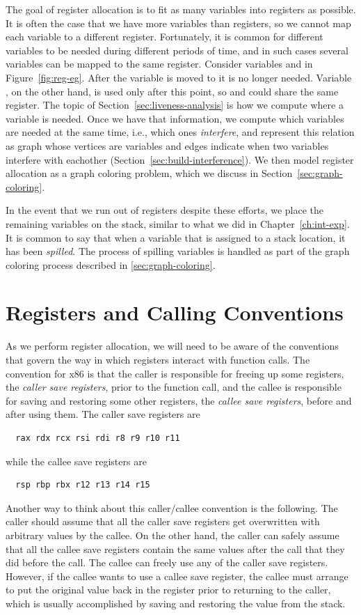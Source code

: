 \documentclass[11pt]{book}
\begin{document}
The goal of register allocation is to fit as many variables into
registers as possible. It is often the case that we have more
variables than registers, so we cannot map each variable to a
different register. Fortunately, it is common for different variables
to be needed during different periods of time, and in such cases
several variables can be mapped to the same register.  Consider
variables  and  in Figure~\ref{fig:reg-eg}.  After the
variable  is moved to  it is no longer needed.
Variable , on the other hand, is used only after this point,
so  and  could share the same register. The topic of
Section~\ref{sec:liveness-analysis} is how we compute where a variable
is needed.  Once we have that information, we compute which variables
are needed at the same time, i.e., which ones \emph{interfere}, and
represent this relation as graph whose vertices are variables and
edges indicate when two variables interfere with eachother
(Section~\ref{sec:build-interference}). We then model register
allocation as a graph coloring problem, which we discuss in
Section~\ref{sec:graph-coloring}.

In the event that we run out of registers despite these efforts, we
place the remaining variables on the stack, similar to what we did in
Chapter~\ref{ch:int-exp}. It is common to say that when a variable
that is assigned to a stack location, it has been \emph{spilled}. The
process of spilling variables is handled as part of the graph coloring
process described in \ref{sec:graph-coloring}.

\section{Registers and Calling Conventions}
\label{sec:calling-conventions}

As we perform register allocation, we will need to be aware of the
conventions that govern the way in which registers interact with
function calls. The convention for x86 is that the caller is
responsible for freeing up some registers, the \emph{caller save
  registers}, prior to the function call, and the callee is
responsible for saving and restoring some other registers, the
\emph{callee save registers}, before and after using them. The caller
save registers are
\begin{lstlisting}
  rax rdx rcx rsi rdi r8 r9 r10 r11
\end{lstlisting}
while the callee save registers are
\begin{lstlisting}
  rsp rbp rbx r12 r13 r14 r15
\end{lstlisting}
Another way to think about this caller/callee convention is the
following. The caller should assume that all the caller save registers
get overwritten with arbitrary values by the callee.  On the other
hand, the caller can safely assume that all the callee save registers
contain the same values after the call that they did before the call.
The callee can freely use any of the caller save registers.  However,
if the callee wants to use a callee save register, the callee must
arrange to put the original value back in the register prior to
returning to the caller, which is usually accomplished by saving and
restoring the value from the stack.
\end{document}
